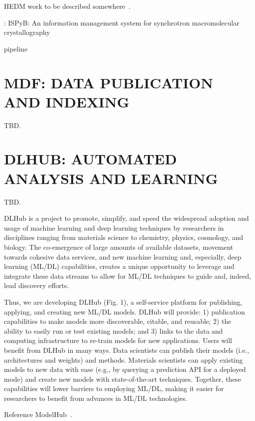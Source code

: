 \documentclass{aip-cp}
\newcommand\ian[1]{}
\newcommand\ian[1]{{\color{red}[Ian: #1]}}
\begin{document}
HEDM work to be described somewhere~\cite{park2015high}.

\cite{delageniere2011ispyb}: 
ISPyB: An information management system for synchrotron macromolecular crystallography

pipeline~\cite{wozniak2015big}


\ian{Petrel should get a mention.}



\section{MDF: DATA PUBLICATION AND INDEXING}

TBD.


\section{DLHUB: AUTOMATED ANALYSIS AND LEARNING}

TBD.

DLHub is a project to promote, simplify, and speed the widespread adoption and usage of machine learning and deep learning techniques by researchers in disciplines ranging from materials science to chemistry, physics, cosmology, and biology. The co-emergence of large amounts of available datasets, movement towards cohesive data services, and new machine learning and, especially, deep learning (ML/DL) capabilities, creates a unique opportunity to leverage and integrate these data streams to allow for ML/DL techniques to guide and, indeed, lead discovery efforts.
 
Thus, we are developing DLHub (Fig. 1), a self-service platform for publishing, applying, and creating new ML/DL models. DLHub will provide: 1) publication capabilities to make models more discoverable, citable, and reusable; 2) the ability to easily run or test existing models; and 3) links to the data and computing infrastructure to re-train models for new applications. Users will benefit from DLHub in many ways. Data scientists can publish their models (i.e., architectures and weights) and methods. Materials scientists can apply existing models to new data with ease (e.g., by querying a prediction API for a deployed mode) and create new models with state-of-the-art techniques. Together, these capabilities will lower barriers to employing ML/DL, making it easier for researchers to benefit from advances in ML/DL technologies. 

Reference ModelHub~\cite{miao2017towards}. 
\end{document}
